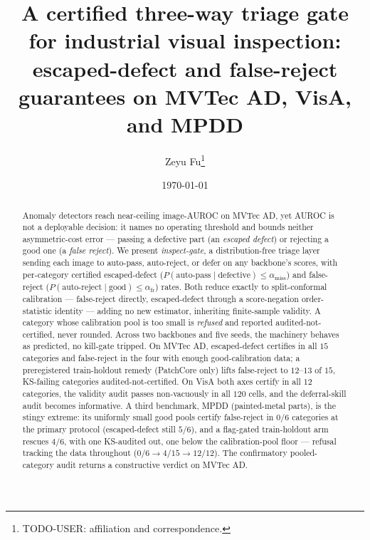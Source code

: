 \documentclass[11pt]{article}
\title{A certified three-way triage gate for industrial visual inspection:
escaped-defect and false-reject guarantees on MVTec AD, VisA, and MPDD}
\author{Zeyu Fu\thanks{TODO-USER: affiliation and correspondence.}}
\date{\today}
\begin{document}
\maketitle

\begin{abstract}
\noindent Anomaly detectors reach near-ceiling image-AUROC on MVTec AD, yet AUROC is not a
deployable decision: it names no operating threshold and bounds neither asymmetric-cost error ---
passing a defective part (an \emph{escaped defect}) or rejecting a good one (a \emph{false reject}).
We present \emph{inspect-gate}, a distribution-free triage layer sending each image to auto-pass,
auto-reject, or defer on any backbone's scores, with per-category certified escaped-defect
($P(\text{auto-pass}\mid\text{defective}) \le \alpha_{\text{miss}}$) and false-reject
($P(\text{auto-reject}\mid\text{good}) \le \alpha_{\text{fr}}$) rates. Both reduce exactly to
split-conformal calibration --- false-reject directly, escaped-defect through a score-negation
order-statistic identity --- adding no new estimator, inheriting finite-sample validity. A
category whose calibration pool is too small is \emph{refused} and reported
audited-not-certified, never rounded. Across two backbones and five
seeds, the machinery behaves as predicted, no kill-gate tripped. On MVTec AD,
escaped-defect certifies in all $15$ categories and false-reject in the four with enough
good-calibration data; a preregistered train-holdout remedy (PatchCore only) lifts false-reject to
$12$--$13$ of $15$, KS-failing categories audited-not-certified. On VisA both axes certify in all
$12$ categories, the validity audit passes non-vacuously in all
$120$ cells, and the deferral-skill audit becomes informative. A third benchmark, MPDD
(painted-metal parts), is the stingy extreme: its uniformly small good pools certify false-reject
in $0/6$ categories at the primary protocol (escaped-defect still $5/6$), and a flag-gated
train-holdout arm rescues $4/6$, with one KS-audited out, one below the calibration-pool
floor --- refusal tracking the data throughout ($0/6 \to 4/15 \to 12/12$). The confirmatory pooled-category
audit returns a constructive verdict on MVTec AD.
\end{abstract}
\end{document}
